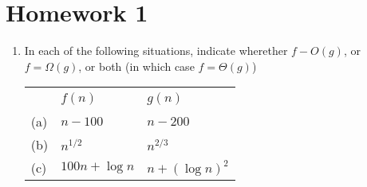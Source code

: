 \documentclass[a4paper,12pt]{article}
\begin{document}
\section*{Homework 1}

\begin{enumerate}
    \item In each of the following situations, indicate wherether $f - O(g)$, or $f = \Omega(g)$, or both (in which case $f = \Theta(g)$)

    \begin{tabular}{lll}
      ~ & $f(n)$ & $g(n)$ \\
      (a) & $n - 100$ & $n - 200$ \\
      (b) & $n^{1/2}$ & $n^{2/3}$ \\
      (c) & $100n + \log n$ & $n + (\log n)^2$ \\
    \end{tabular}
\end{enumerate}
\end{document}
